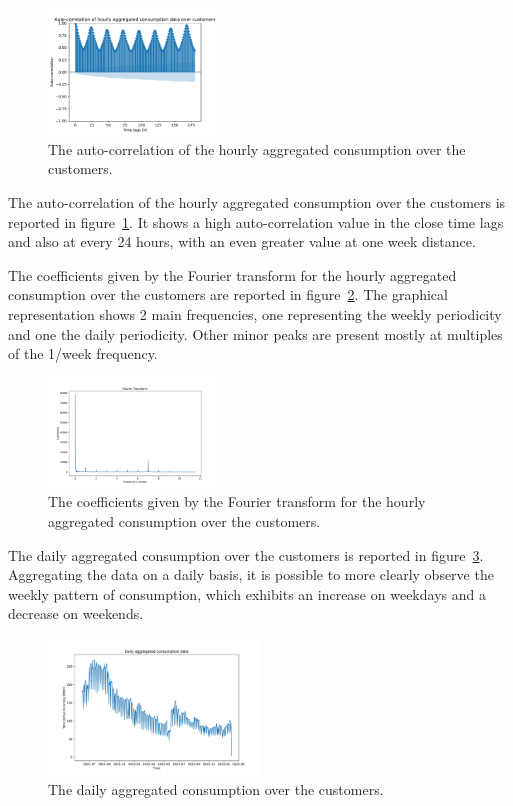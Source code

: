 \begin{figure}[H]
\centering
\includegraphics[width=0.4\textwidth]{images/demand/hourly_correlation_week_range}
\caption{The auto-correlation of the hourly aggregated consumption over the customers.}
\label{fig:demandcorrelation}
\end{figure}

The auto-correlation of the hourly aggregated consumption over the customers is reported in figure~\ref{fig:demandcorrelation}.
It shows a high auto-correlation value in the close time lags and also at every 24 hours, with an even greater value at one week distance.

The coefficients given by the Fourier transform for the hourly aggregated consumption over the customers are reported in figure~\ref{fig:demandft}.
The graphical representation shows 2 main frequencies, one representing the weekly periodicity and one the daily periodicity.
Other minor peaks are present mostly at multiples of the 1/week frequency.

\begin{figure}[H]
\centering
\includegraphics[width=0.4\textwidth]{images/demand/ft_hour_week}
\caption{The coefficients given by the Fourier transform for the hourly aggregated consumption over the customers.}
\label{fig:demandft}
\end{figure}

The daily aggregated consumption over the customers is reported in figure~\ref{fig:demanddataplotday}.
Aggregating the data on a daily basis, it is possible to more clearly observe the weekly pattern of consumption, which exhibits an increase on weekdays and a decrease on weekends.

\begin{figure}[H]
\centering
\includegraphics[width=0.5\textwidth]{images/demand/data_day_aggregated_plot}
\caption{The daily aggregated consumption over the customers.}
\label{fig:demanddataplotday}
\end{figure}

